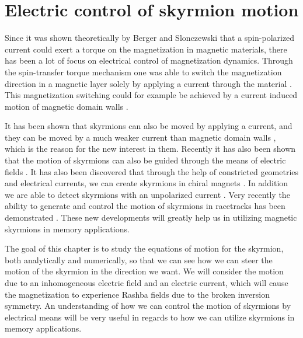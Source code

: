 \chapter{Electric control of skyrmion motion} \label{chap:SkyrmionDynamics}
Since it was shown theoretically by Berger \cite{Berger1978,Berger1984,Berger1992,Berger1996} and Slonczewski \cite{Slonczewski1996} that a spin-polarized current could exert a torque on the magnetization in magnetic materials, there has been a lot of focus on electrical control of magnetization dynamics. Through the spin-transfer torque mechanism one was able to switch the magnetization direction in a magnetic layer solely by applying a current through the material \cite{Myers1999,Sun1999,Katine2000}. This magnetization switching could for example be achieved by a current induced motion of magnetic domain walls \cite{Yamanouchi2004,Yamaguchi2004,Saitoh2004,Yamanouchi2006}. 

It has been shown that skyrmions can also be moved by applying a current, and they can be moved by a much weaker current than magnetic domain walls \cite{Jonietz2010,Yu2012}, which is the reason for the new interest in them. Recently it has also been shown that the motion of skyrmions can also be guided through the means of electric fields \cite{Upadhyaya2015}. It has also been discovered that through the help of constricted geometries and electrical currents, we can create skyrmions in chiral magnets \cite{Iwasaki2013,Sampaio2013,Jiang2015}. In addition we are able to detect skyrmions with an unpolarized current \cite{Monchesky2015}. Very recently the ability to generate and control the motion of skyrmions in racetracks has been demonstrated \cite{Woo2016}. These new developments will greatly help us in utilizing magnetic skyrmions in memory applications. 

The goal of this chapter is to study the equations of motion for the skyrmion, both analytically and numerically, so that we can see how we can steer the motion of the skyrmion in the direction we want. We will consider the motion due to an inhomogeneous electric field and an electric current, which will cause the magnetization to experience Rashba fields due to the broken inversion symmetry. An understanding of how we can control the motion of skyrmions by electrical means will be very useful in regards to how we can utilize skyrmions in memory applications.
